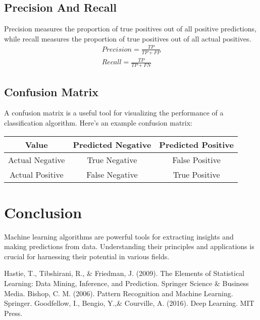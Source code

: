 \documentclass{article}
\begin{document}
	\subsection{Precision And Recall}
	Precision measures the proportion of true positives out of all positive predictions, while recall measures the proportion of true positives out of all actual positives.
	\begin{equation}
		\begin{split}
			Precision = {\frac{TP}{TP+FP}}\\
			Recall = {\frac{TP}{TP+FN}}
		\end{split}
	\end{equation}
	\subsection{Confusion Matrix}
	A confusion matrix is a useful tool for visualizing the performance of a classification algorithm. Here's an example confusion matrix:
	\begin{center}
		\begin{tabular}{ |c | c | c | }
			\hline
			\rowcolor{gray}
			Value & Predicted Negative & Predicted Positive \\      
			\hline
			Actual Negative & True Negative & False Positive \\
			\hline
			Actual Positive & False Negative & True Positive \\
			\hline
		\end{tabular}
	\end{center}
	
	\section{Conclusion}
	Machine learning algorithms are powerful tools for extracting insights and making predictions from data. Understanding their principles and applications is crucial for harnessing their potential in various fields.
	
	\begin{thebibliography}{9}
		Hastie, T., Tibshirani, R., \& Friedman, J. (2009). The Elements of Statistical Learning: Data Mining, Inference, and Prediction. Springer Science \& Business Media.
		Bishop, C. M. (2006). Pattern Recognition and Machine Learning. Springer.
		Goodfellow, I., Bengio, Y.,\& Courville, A. (2016). Deep Learning. MIT Press.
	\end{thebibliography}
\end{document}
